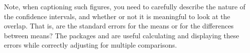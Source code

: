 % 
% 
% 
%
% 


% 


% 


% 
% 


Note, when captioning such figures, you need to carefully describe the nature of the confidence intervals, and whether or not it is meaningful to look at the overlap.  That is, are the standard errors for the means or for the differences between means?  The packages  and  are useful calculating and displaying these errors while correctly adjusting for multiple comparisons.

